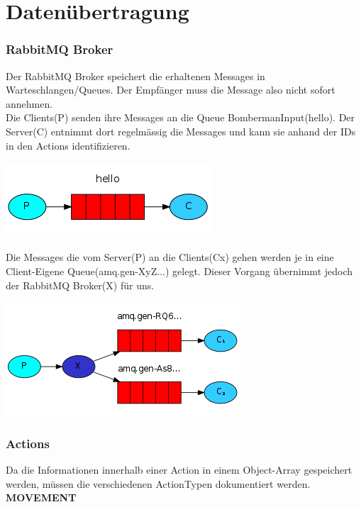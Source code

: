 \documentclass[11pt]{scrartcl}
\begin{document}
\section{Datenübertragung}
\subsubsection{RabbitMQ Broker}
Der RabbitMQ Broker speichert die erhaltenen Messages in Warteschlangen/Queues. Der Empfänger muss die Message also nicht sofort annehmen. \\
Die Clients(P) senden ihre Messages an die Queue BombermanInput(hello). Der Server(C) entnimmt dort regelmässig die Messages und kann sie anhand der IDs in den Actions identifizieren.

\includegraphics[scale=1.0]{clientToServer}\\\\

Die Messages die vom Server(P) an die Clients(Cx) gehen werden je in eine Client-Eigene Queue(amq.gen-XyZ...) gelegt. Dieser Vorgang übernimmt jedoch der RabbitMQ Broker(X) für uns.

\includegraphics[scale=1.0]{serverToClient}\\

\newpage

\subsubsection{Actions}
Da die Informationen innerhalb einer Action in einem Object-Array gespeichert werden, müssen die verschiedenen ActionTypen dokumentiert werden.\\

\textbf{MOVEMENT}\\
\end{document}
